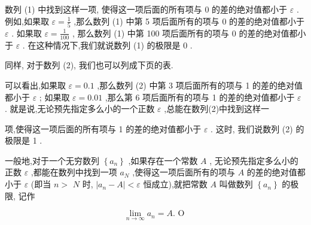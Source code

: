 \documentclass[lang=cn,newtx,10pt,scheme=chinese]{elegantbook}
\begin{document}
数列 (1) 中找到这样一项, 使得这一项后面的所有项与 0 的差的绝对值都小于 \(\varepsilon\) . 例如,如果取 \(\varepsilon = \frac{1}{5}\) ,那么数列 (1) 中第 5 项后面所有的项与 0 的差的绝对值都小于 \(\varepsilon\) . 如果取 \(\varepsilon = \frac{1}{100}\) , 那么数列 (1) 中第 100 项后面所有的项与 0 的差的绝对值都小于 \(\varepsilon\) . 在这种情况下,我们就说数列 (1) 的极限是 0 .

同样, 对于数列 (2), 我们也可以列成下页的表.

可以看出,如果取 \(\varepsilon = {0.1}\) ,那么数列 (2) 中第 3 项后面所有的项与 1 的差的绝对值都小于 \(\varepsilon\) ; 如果取 \(\varepsilon = {0.01}\) ,那么第 6 项后面所有的项与 1 的差的绝对值都小于 \(\varepsilon\) . 就是说,无论预先指定多么小的一个正数 \(\varepsilon\) ,总能在数列(2)中找到这样一

\begin{center}
\end{center}

项,使得这一项后面的所有项与 1 的差的绝对值都小于 \(\varepsilon\) . 这时, 我们说数列 (2) 的极限是 1 .

\begin{definition}[数列的极限]
一般地,对于一个无穷数列 \(\left\{ {a}_{n}\right\}\) ,如果存在一个常数 \(A\) , 无论预先指定多么小的正数 \(\varepsilon\) ,都能在数列中找到一项 \({a}_{N}\) ,使得这一项后面所有的项与 \(A\) 的差的绝对值都小于 \(\varepsilon\) (即当 \(n >\) \(N\) 时, \(\left| {{a}_{n} - A}\right| < \varepsilon\) 恒成立),就把常数 \(A\) 叫做数列 \(\left\{ {a}_{n}\right\}\) 的极限, 记作

\[
\mathop{\lim }\limits_{{n \rightarrow \infty }}{a}_{n} = A\text{. O }
\]

\end{definition}
\end{document}
